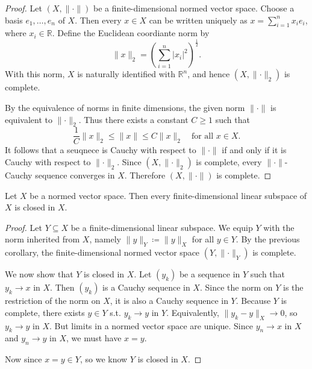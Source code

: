 \begin{proof}
    Let \((X, \lVert \cdot \rVert )\) be a finite-dimensional normed vector space. Choose a basis \(e_1, \dots , e_n\) of \(X\). Then every \(x \in X\) can be written uniquely as \(x = \sum_{i=1}^n x_i e_i \), where \(x_i \in \mathbb{R}\). Define the Euclidean coordiante norm by 
    \[
        \lVert x \rVert_2 = \left( \sum_{i=1}^n \vert x_i \vert^2   \right)^{\frac{1}{2}}.  
    \]     
    With this norm, \(X\) is naturally identified with \(\mathbb{R} ^n\), and hence \((X, \lVert \cdot \rVert_2 )\) is complete. 

    By the equivalence of norms in finite dimensions, the given norm \(\lVert \cdot \rVert \) is equivalent to \(\lVert \cdot \rVert_2 \). Thus there exists a constant \(C \ge 1\) such that 
    \[
        \frac{1}{C} \lVert x \rVert_2 \le \lVert x \rVert \le C \lVert x \rVert_2 \quad \text{for all } x \in X.    
    \]      
    It follows that a seuqnece is Cauchy with respect to \(\lVert \cdot \rVert \) if and only if it is Cauchy with respect to \(\lVert \cdot \rVert_2 \). Since \((X, \lVert \cdot \rVert_2 )\) is complete, every \(\lVert \cdot \rVert \)-Cauchy sequence converges in \(X\). Therefore \((X, \lVert \cdot \rVert )\) is complete.     
\end{proof}

\begin{corollary}
   Let \(X\) be a normed vector space. Then every finite-dimensional linear subspace of \(X\) is closed in \(X\).    
\end{corollary}
\begin{proof}
    Let \(Y \subseteq X\) be a finite-dimensional linear subspace. We equip \(Y\) with the norm inherited from \(X\), namely \(\lVert y \rVert_Y \coloneqq \lVert y \rVert_X  \) for all \(y \in Y\). By the previous corollary, the finite-dimensional normed vector space \((Y, \lVert \cdot \rVert_Y )\) is complete. 

    We now show that \(Y\) is closed in \(X\). Let \((y_k)\) be a sequence in \(Y\) such that \(y_k \to x\) in \(X\). Then \((y_k)\) is a Cauchy sequence in \(X\). Since the norm on \(Y\) is the restriction of the norm on \(X\), it is also a Cauchy sequence in \(Y\). Because \(Y\) is complete, there exists \(y \in Y\) s.t. \(y_k \to y\) in \(Y\). Equivalently, \(\lVert y_k - y \rVert_X \to 0\), so \(y_k \to y\) in \(X\). But limits in a normed vector space are unique. Since \(y_n \to x\) in \(X\) and \(y_n \to y\) in \(X\), we must have \(x = y\). 

    Now since \(x = y \in Y\), so we know \(Y\) is closed in \(X\).                              
\end{proof}

